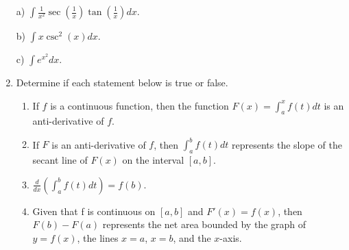 \documentclass[12pt]{article}
\begin{document}
\begin{enumerate}
a) $\int \frac{1}{x^2}\sec(\frac{1}{x})\tan(\frac{1}{x})dx.$

b) $\int x\csc^2(x)dx$.

c) $\int e^{x^2}dx$.

\item Determine if each statement below is true or false.

\begin{enumerate}

\item If $f$ is a continuous function, then the function $F(x) = \int_a ^x f(t)dt$ is an anti-derivative
of $f$.

\item If $F$ is an anti-derivative of $f$, then $\int_a^b f(t)dt$ represents the slope of the secant line of
$F(x)$ on the interval $[a, b]$.

\item $\frac{d}{dx}\left(\int_{a}^b f(t)dt\right) = f(b)$.

\item Given that f is continuous on $[a, b]$ and $F'(x) = f(x)$, then $F(b) - F(a)$ represents the
net area bounded by the graph of $y = f(x)$, the lines $x = a$, $x = b$, and the $x$-axis.

\end{enumerate}


\end{enumerate}
\end{document}
